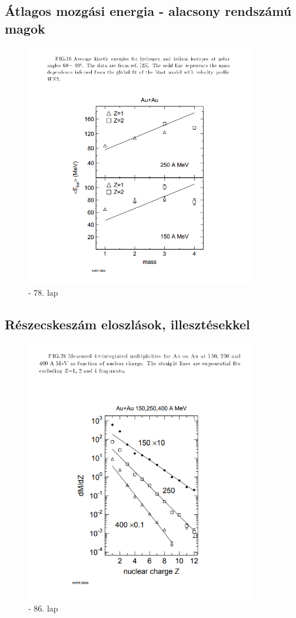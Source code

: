\documentclass[a4paper,12pt]{article}
\begin{document}
\begin{appendices}
\subsection{Átlagos mozgási energia - alacsony rendszámú magok}
\begin{figure}[H]
\centering
\includegraphics[width=0.9\textwidth]{./avgkinsmallz.png}
\caption{\cite{REISDORF1997493} - 78. lap}
\end{figure}
\subsection{Részecskeszám eloszlások, illesztésekkel}
\begin{figure}[H]
\centering
\includegraphics[width=0.9\textwidth]{./multiplicities.png}
\caption{\cite{REISDORF1997493} - 86. lap}
\end{figure}
\end{appendices}


\end{document}
